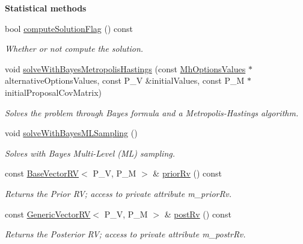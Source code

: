 \begin{Indent}{\bf Statistical methods}\par
\begin{DoxyCompactItemize}
\item 
bool \hyperlink{class_q_u_e_s_o_1_1_statistical_inverse_problem_a8af5f8ed1db58cf2625bcf459d249167}{compute\-Solution\-Flag} () const 
\begin{DoxyCompactList}\small\item\em Whether or not compute the solution. \end{DoxyCompactList}\item 
void \hyperlink{class_q_u_e_s_o_1_1_statistical_inverse_problem_a924189e647110129682308b9bffc3a0d}{solve\-With\-Bayes\-Metropolis\-Hastings} (const \hyperlink{class_q_u_e_s_o_1_1_mh_options_values}{Mh\-Options\-Values} $\ast$alternative\-Options\-Values, const P\-\_\-\-V \&initial\-Values, const P\-\_\-\-M $\ast$initial\-Proposal\-Cov\-Matrix)
\begin{DoxyCompactList}\small\item\em Solves the problem through Bayes formula and a Metropolis-\/\-Hastings algorithm. \end{DoxyCompactList}\item 
void \hyperlink{class_q_u_e_s_o_1_1_statistical_inverse_problem_a72a2bfd14054b4c8de14fb86da240ab8}{solve\-With\-Bayes\-M\-L\-Sampling} ()
\begin{DoxyCompactList}\small\item\em Solves with Bayes Multi-\/\-Level (M\-L) sampling. \end{DoxyCompactList}\item 
const \hyperlink{class_q_u_e_s_o_1_1_base_vector_r_v}{Base\-Vector\-R\-V}$<$ P\-\_\-\-V, P\-\_\-\-M $>$ \& \hyperlink{class_q_u_e_s_o_1_1_statistical_inverse_problem_a954df0672a7c1271eaff53b8d5f3fbc2}{prior\-Rv} () const 
\begin{DoxyCompactList}\small\item\em Returns the Prior R\-V; access to private attribute m\-\_\-prior\-Rv. \end{DoxyCompactList}\item 
const \hyperlink{class_q_u_e_s_o_1_1_generic_vector_r_v}{Generic\-Vector\-R\-V}$<$ P\-\_\-\-V, P\-\_\-\-M $>$ \& \hyperlink{class_q_u_e_s_o_1_1_statistical_inverse_problem_a69360a2f2ec5f33b33c5b5f61ec15344}{post\-Rv} () const 
\begin{DoxyCompactList}\small\item\em Returns the Posterior R\-V; access to private attribute m\-\_\-postr\-Rv. \end{DoxyCompactList}\item 

\end{DoxyCompactItemize}
\end{Indent}
